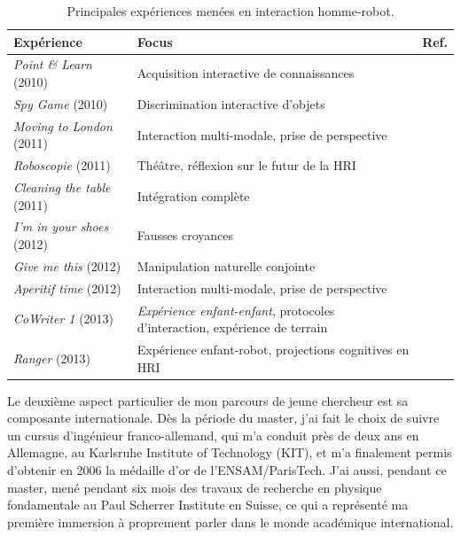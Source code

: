 \documentclass[a4paper]{article}
\begin{document}
\begin{table}
\begin{center}

    \begin{tabular}{lp{6cm}l}
\bf{Expérience} & Focus & Ref. \\
\hline
{\it Point \& Learn} (2010) & Acquisition interactive de connaissances & \cite{Lemaignan2010} \\
{\it Spy Game} (2010) & Discrimination interactive d'objets & \cite{ros2010which} \\
{\it Moving to London} (2011) & Interaction multi-modale, \newline prise de perspective & \cite{lemaignan2011what} \\
{\it Roboscopie} (2011) & Théâtre, \newline réflexion sur le futur de la HRI & \cite{lemaignan2012roboscopie} \\
{\it Cleaning the table} (2011) & Intégration complète & \cite{alami2011when} \\
{\it I'm in your shoes} (2012) & Fausses croyances & \cite{warnier2012when} \\
{\it Give me this} (2012) & Manipulation naturelle conjointe & \cite{gharbi2013natural} \\
{\it Aperitif time} (2012) & Interaction multi-modale, \newline prise de perspective & \cite{lemaignan2013talking} \\
{\it CoWriter 1} (2013) & \emph{Expérience enfant-enfant}, \newline protocoles
d'interaction, expérience de terrain &  \\
{\it Ranger} (2013) & Expérience enfant-robot, \newline projections cognitives en HRI &
\cite{fink2014which, lemaignan2014dynamics} \\
\hline

\end{tabular}
\end{center}
\caption{Principales expériences menées en interaction homme-robot.}
\label{experiences}
\end{table}


Le deuxième aspect particulier de mon parcours de jeune chercheur est sa
composante internationale. Dès la période du master, j'ai fait le choix de
suivre un cursus d'ingénieur franco-allemand, qui m'a conduit près de deux ans
en Allemagne, au Karlsruhe Institute of Technology (KIT), et m'a finalement
permis d'obtenir en 2006 la médaille d'or de l'ENSAM/ParisTech. J'ai aussi,
pendant ce master, mené pendant six mois des travaux de recherche en physique
fondamentale au Paul Scherrer Institute en Suisse, ce qui a représenté ma
première immersion à proprement parler dans le monde académique international.
\end{document}
